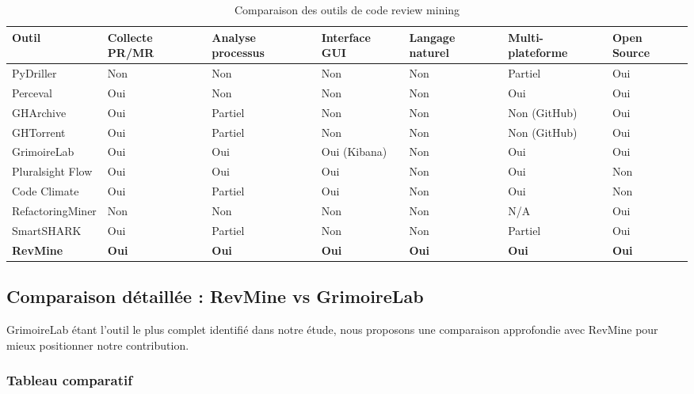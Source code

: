 \begin{table}[H]
\centering
\small
\begin{tabularx}{\textwidth}{|l|Y|Y|Y|Y|Y|Y|}
\hline
\textbf{Outil} & \textbf{Collecte PR/MR} & \textbf{Analyse processus} & \textbf{Interface GUI} & \textbf{Langage naturel} & \textbf{Multi-plateforme} & \textbf{Open Source} \\
\hline
PyDriller & Non & Non & Non & Non & Partiel & Oui \\
\hline
Perceval & Oui & Non & Non & Non & Oui & Oui \\
\hline
GHArchive & Oui & Partiel & Non & Non & Non (GitHub) & Oui \\
\hline
GHTorrent & Oui & Partiel & Non & Non & Non (GitHub) & Oui \\
\hline
GrimoireLab & Oui & Oui & Oui (Kibana) & Non & Oui & Oui \\
\hline
Pluralsight Flow & Oui & Oui & Oui & Non & Oui & Non \\
\hline
Code Climate & Oui & Partiel & Oui & Non & Oui & Non \\
\hline
RefactoringMiner & Non & Non & Non & Non & N/A & Oui \\
\hline
SmartSHARK & Oui & Partiel & Non & Non & Partiel & Oui \\
\hline
\textbf{RevMine} & \textbf{Oui} & \textbf{Oui} & \textbf{Oui} & \textbf{Oui} & \textbf{Oui} & \textbf{Oui} \\
\hline
\end{tabularx}
\caption{Comparaison des outils de code review mining}
\label{tab:comparaison_outils}
\end{table}

\subsection{Comparaison détaillée : RevMine vs GrimoireLab}

GrimoireLab étant l'outil le plus complet identifié dans notre étude, nous proposons une comparaison approfondie avec RevMine pour mieux positionner notre contribution.

\subsubsection{Tableau comparatif}

